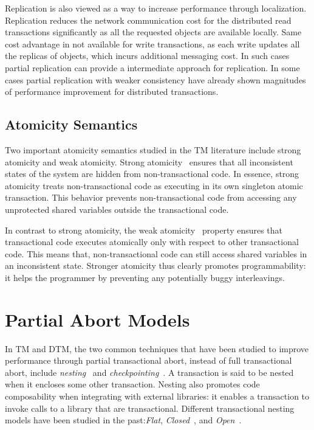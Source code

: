 \documentclass[12pt,english]{report}
\begin{document}
Replication is also viewed as a way to increase performance through localization. Replication reduces the network communication cost for the distributed read transactions significantly as all the requested objects are available locally. Same cost advantage in not available for write transactions, as each write updates all the replicas of objects, which incurs additional messaging cost. In such cases partial replication can provide a intermediate approach for replication. In some cases partial replication with weaker consistency have already shown magnitudes of performance improvement for distributed transactions.~\cite{GMU:peluso2012scalability}    

\subsection{Atomicity Semantics}

Two important atomicity semantics studied in the TM literature include strong atomicity and weak atomicity. Strong atomicity~\cite{abadi2009transactional} ensures that all inconsistent states of the system are hidden from non-transactional code. 
In essence, strong atomicity treats non-transactional code as executing in its own singleton atomic transaction. This behavior prevents non-transactional code from accessing any unprotected shared variables outside the transactional code. 

In contrast to strong atomicity, the weak atomicity~\cite{strongAtomicityblundell2006subtleties} property ensures that transactional code executes  atomically only with respect to other transactional code. 
This means that, non-transactional code can still access shared variables in an inconsistent state. Stronger atomicity thus clearly promotes programmability: it helps the programmer by preventing any potentially buggy interleavings. 

\section{Partial Abort Models}

In TM and DTM, the two common techniques that have been studied to improve performance through partial transactional abort, instead of full transactional abort, include \textit{nesting}~\cite{moss2005nested} and \textit{checkpointing}~\cite{koskinen2008checkpoints}. 
A transaction is said to be nested when it encloses some other transaction. Nesting also promotes code composability when integrating with external libraries: it enables a transaction to invoke calls to a library that are transactional. Different transactional nesting models have been studied in the past:\emph{Flat}, \emph{Closed}~\cite{turcu2012closed}, and \emph{Open}~\cite{turcu2012open}. 
\end{document}

